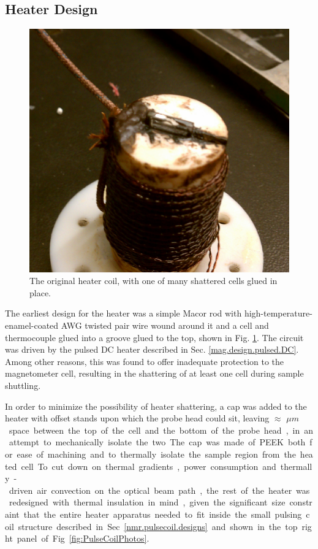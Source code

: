 \documentclass[PaulGanssle-Thesis.tex]{subfiles}
\begin{document}
\subsection{Heater Design}
\label{mag.design.physical}
\begin{figure}
\includegraphics[width=0.3\tw]{figures/magnetometer/HeaterCoilVersion1-BrokenCellSmaller.png}
\caption{The original heater coil, with one of many shattered cells glued in place.}
\label{fig:OriginalHeaterCoilPhoto}
\end{figure}
The earliest design for the heater was a simple Macor rod with high-temperature-enamel-coated \unit[32]{AWG} twisted pair wire wound around it and a cell and thermocouple glued into a groove glued to the top, shown in Fig. \ref{fig:OriginalHeaterCoilPhoto}. The circuit was driven by the pulsed DC heater described in Sec. \ref{mag.design.pulsed.DC}. Among other reasons, this was found to offer inadequate protection to the magnetometer cell, resulting in the shattering of at least one cell during sample shuttling.

In order to minimize the possibility of heater shattering, a cap was added to the heater with offset stands upon which the probe head could sit, leaving $\approx$ \unit[100--200]{$\mu m$} space between the top of the cell and the bottom of the probe head, in an attempt to mechanically isolate the two. The cap was made of PEEK both for ease of machining and to thermally isolate the sample region from the heated cell. To cut down on thermal gradients, power consumption and thermally-driven air convection on the optical beam path, the rest of the heater was redesigned with thermal insulation in mind, given the significant size constraint that the entire heater apparatus needed to fit inside the small pulsing coil structure described in Sec. \ref{nmr.pulsecoil.designs} and shown in the top right panel of Fig. \ref{fig:PulseCoilPhotos}. 
\end{document}
